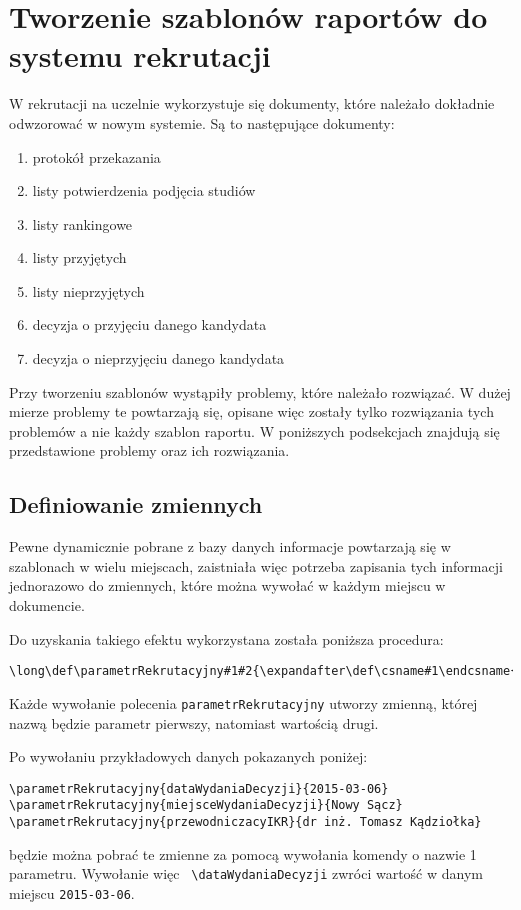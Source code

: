 \section{Tworzenie szablonów raportów do systemu rekrutacji}

W rekrutacji na uczelnie wykorzystuje się dokumenty, które należało dokładnie odwzorować w nowym systemie. Są to następujące dokumenty:\\
\begin{enumerate}
\item protokół przekazania
\item listy potwierdzenia podjęcia studiów 
\item listy rankingowe 
\item listy przyjętych
\item listy nieprzyjętych
\item decyzja o przyjęciu danego kandydata
\item decyzja o nieprzyjęciu danego kandydata 
\end{enumerate}
\vspace{5mm}
Przy tworzeniu szablonów wystąpiły problemy, które należało rozwiązać.  W dużej mierze problemy te powtarzają się,  opisane więc zostały tylko rozwiązania tych problemów a nie każdy szablon raportu. W poniższych podsekcjach znajdują się przedstawione problemy oraz ich rozwiązania.
\subsection{Definiowanie zmiennych}

Pewne dynamicznie pobrane z bazy danych informacje powtarzają się w szablonach w wielu miejscach, zaistniała więc potrzeba zapisania tych informacji jednorazowo do zmiennych, które można wywołać w każdym miejscu w dokumencie. 
\par
Do uzyskania takiego efektu wykorzystana została poniższa procedura:
 \begin{lstlisting}
\long\def\parametrRekrutacyjny#1#2{\expandafter\def\csname#1\endcsname{#2}}
 \end{lstlisting}
Każde wywołanie polecenia \texttt{parametrRekrutacyjny} utworzy zmienną, której nazwą będzie parametr pierwszy, natomiast wartością drugi.
\par 
Po wywołaniu przykładowych danych pokazanych poniżej:
 \begin{lstlisting}
\parametrRekrutacyjny{dataWydaniaDecyzji}{2015-03-06}
\parametrRekrutacyjny{miejsceWydaniaDecyzji}{Nowy Sącz}
\parametrRekrutacyjny{przewodniczacyIKR}{dr inż. Tomasz Kądziołka}
 \end{lstlisting}
będzie można pobrać te zmienne za pomocą wywołania komendy o nazwie 1 parametru. Wywołanie więc \texttt{ \textbackslash dataWydaniaDecyzji} zwróci wartość w danym miejscu \texttt{2015-03-06}.


